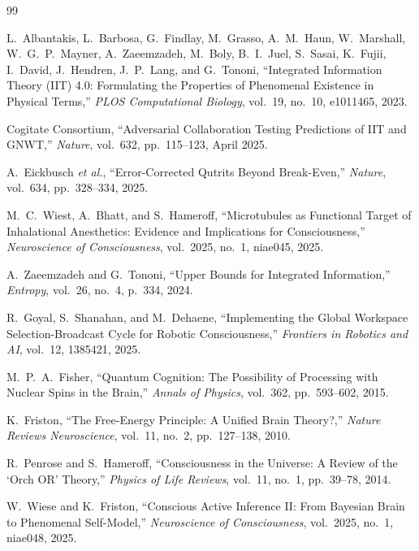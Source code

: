 \documentclass[12pt,a4paper]{article}
\begin{document}
\begin{thebibliography}{99}

L.~Albantakis, L.~Barbosa, G.~Findlay, M.~Grasso, A.~M.~Haun,
W.~Marshall, W.~G.~P.~Mayner, A.~Zaeemzadeh, M.~Boly, B.~I.~Juel,
S.~Sasai, K.~Fujii, I.~David, J.~Hendren, J.~P.~Lang, and G.~Tononi,
``Integrated Information Theory (IIT) 4.0: Formulating the Properties of
Phenomenal Existence in Physical Terms,''
\emph{PLOS Computational Biology}, vol.~19, no.~10, e1011465, 2023.

Cogitate Consortium,
``Adversarial Collaboration Testing Predictions of IIT and GNWT,''
\emph{Nature}, vol.~632, pp.~115--123, April 2025.

A.~Eickbusch \emph{et al.},
``Error-Corrected Qutrits Beyond Break-Even,''
\emph{Nature}, vol.~634, pp.~328--334, 2025.

M.~C.~Wiest, A.~Bhatt, and S.~Hameroff,
``Microtubules as Functional Target of Inhalational Anesthetics:
Evidence and Implications for Consciousness,''
\emph{Neuroscience of Consciousness}, vol.~2025, no.~1, niae045, 2025.

A.~Zaeemzadeh and G.~Tononi,
``Upper Bounds for Integrated Information,''
\emph{Entropy}, vol.~26, no.~4, p.~334, 2024.

R.~Goyal, S.~Shanahan, and M.~Dehaene,
``Implementing the Global Workspace Selection-Broadcast Cycle for Robotic
Consciousness,''
\emph{Frontiers in Robotics and AI}, vol.~12, 1385421, 2025.

M.~P.~A.~Fisher,
``Quantum Cognition: The Possibility of Processing with Nuclear Spins in
the Brain,''
\emph{Annals of Physics}, vol.~362, pp.~593--602, 2015.

K.~Friston,
``The Free-Energy Principle: A Unified Brain Theory?,''
\emph{Nature Reviews Neuroscience}, vol.~11, no.~2, pp.~127--138, 2010.

R.~Penrose and S.~Hameroff,
``Consciousness in the Universe: A Review of the `Orch OR' Theory,''
\emph{Physics of Life Reviews}, vol.~11, no.~1, pp.~39--78, 2014.

W.~Wiese and K.~Friston,
``Conscious Active Inference II: From Bayesian Brain to Phenomenal
Self-Model,''
\emph{Neuroscience of Consciousness}, vol.~2025, no.~1, niae048, 2025.


\end{thebibliography}
\end{document}
